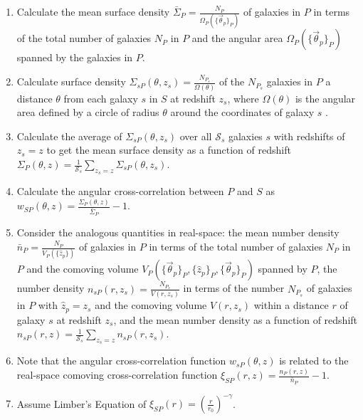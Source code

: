 \documentclass[12pt, onecolumn]{emulateapj}
\begin{document}
\begin{enumerate}

\item Calculate the mean surface density $\bar{\Sigma}_{P}=\frac{N_{P}}{\Omega_{P}(\{\vec{\theta}_{p}\}_{P})}$ of galaxies in $P$ in terms of the total number of galaxies $N_{P}$ in $P$ and the angular area $\Omega_{P}(\{\vec{\theta}_{p}\}_{P})$ spanned by the galaxies in $P$.

\item Calculate surface density $\Sigma_{sP}(\theta,z_{s})=\frac{N_{P_{s}}}{\Omega(\theta)}$ of the $N_{P_{s}}$ galaxies in $P$ a distance $\theta$ from each galaxy $s$ in $S$ at redshift $z_{s}$, where $\Omega(\theta)$ is the angular area defined by a circle of radius $\theta$ around the coordinates of galaxy $s$ .

\item Calculate the average of $\Sigma_{sP}(\theta,z_{s})$ over all $\mathcal{S}_{s}$ galaxies $s$ with redshifts of $z_{s}=z$ to get the mean surface density as a function of redshift $\Sigma_{P}(\theta,z)=\frac{1}{\mathcal{S}_{s}}\sum_{z_{s}=z}\Sigma_{sP}(\theta,z_{s})$.

\item Calculate the angular cross-correlation between $P$ and $S$ as $w_{SP}(\theta,z)=\frac{\Sigma_{P}(\theta,z)}{\bar{\Sigma}_{P}}-1$.  

\item Consider the analogous quantities in real-space: the mean number density $\bar{n}_{P}=\frac{N_{P}}{V_{P}(\{\hat{z}_{p}\})}$ of galaxies in $P$ in terms of the total number of galaxies $N_{P}$ in $P$ and the comoving volume $V_{P}(\{\vec{\theta}_{p}\}_{P},\{\hat{z}_{p}\}_{P},\{\vec{\theta}_{p}\}_{P})$ spanned by $P$, the number density $n_{sP}(r,z_{s})=\frac{N_{P_{s}}}{V(r,z_{s})}$ in terms of the number $N_{P_{s}}$ of galaxies in $P$ with $\hat{z}_{p}=z_{s}$ and the comoving volume $V(r,z_{s})$ within a distance $r$ of galaxy $s$ at redshift $z_{s}$, and the mean number density as a function of redshift $n_{sP}(r,z)=\frac{1}{\mathcal{S}_{s}}\sum_{z_{s}=z}n_{sP}(r,z_{s})$.

\item Note that the angular cross-correlation function $w_{sP}(\theta,z)$ is related to the real-space comoving cross-correlation function $\xi_{SP}(r,z)=\frac{n_{P}(r,z)}{\bar{n}_{P}}-1$.

\item Assume Limber's Equation of $\xi_{SP}(r)=(\frac{r}{r_{0}})^{-\gamma}$.


\end{enumerate}
\end{document}
